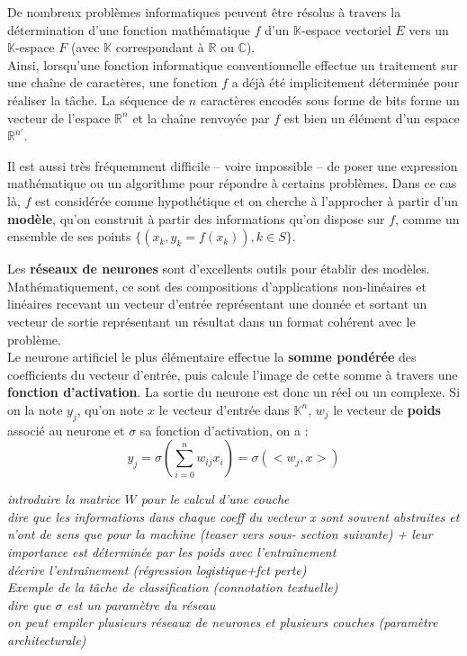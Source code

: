 \documentclass[12pt, french]{report}
\begin{document}
De nombreux problèmes informatiques peuvent être résolus à travers la détermination
d'une fonction mathématique $f$ d'un $\mathbb{K}$-espace vectoriel $E$ vers un 
$\mathbb{K}$-espace $F$ (avec $\mathbb{K}$ correspondant à $\mathbb{R}$ ou
$\mathbb{C}$).\\
Ainsi, lorsqu'une fonction informatique conventionnelle effectue un traitement sur
une chaîne de caractères, une fonction $f$ a déjà été implicitement déterminée pour
réaliser la tâche.
La séquence de $n$ caractères encodés sous forme de bits forme un vecteur de l'espace
$\mathbb{R}^n$ et la chaîne renvoyée par $f$ est bien un élément d'un espace
$\mathbb{R}^{n'}$.

Il est aussi très fréquemment difficile -- voire impossible --
de poser une expression mathématique ou un algorithme pour répondre à certains 
problèmes. Dans ce cas là, $f$ est considérée comme hypothétique et on cherche à
l'approcher à partir d'un \textbf{modèle}, qu'on construit à partir des informations
qu'on dispose sur $f$, comme un ensemble de ses points 
$\{(x_k, y_k=f(x_k)), k \in S\}$.

\vspace{12pt}
Les \textbf{réseaux de neurones} sont d'excellents outils pour établir des modèles.
Mathématiquement, ce sont des compositions d'applications non-linéaires et linéaires
recevant un vecteur d'entrée représentant une donnée et sortant un vecteur de sortie
représentant un résultat dans un format cohérent avec le problème.\\
Le neurone artificiel le plus élémentaire effectue la \textbf{somme pondérée} des 
coefficients du vecteur d'entrée, puis calcule l'image de cette somme à travers
une \textbf{fonction d'activation}. La sortie du neurone est donc un réel ou un
complexe. Si on la note $y_j$, qu'on note $x$ le vecteur d'entrée dans $\mathbb{K}^n$,
$w_j$ le vecteur de \textbf{poids} associé au neurone et $\sigma$ sa fonction d'activation,
on a :
\begin{equation}
    y_j = \sigma(\sum_{i=0}^{n} w_{ij}x_i) = \sigma(<w_j, x>)
\end{equation}

\textit{introduire la matrice $W$ pour le calcul d'une couche\\
dire que les informations dans chaque coeff du vecteur x sont 
souvent abstraites et n'ont de sens que pour la machine (teaser vers sous-
section suivante) + leur importance est déterminée par les poids avec
l'entraînement\\ décrire l'entraînement (régression logistique+fct perte) \\
Exemple de la tâche de classification (connotation textuelle)\\
dire que $\sigma$ est un paramètre du réseau\\
on peut empiler plusieurs réseaux de neurones et plusieurs couches (paramètre
architecturale)}
\end{document}
